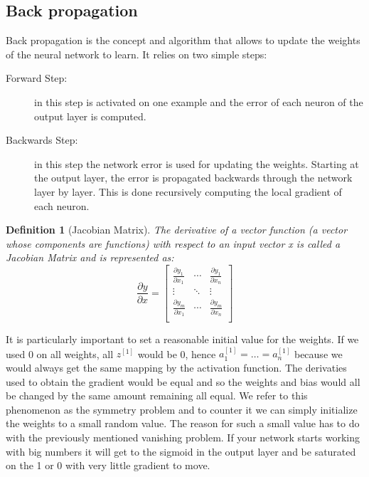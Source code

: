 \documentclass{article}
\newtheorem{definition}{Definition}[section]
\begin{document}
\subsection*{Back propagation}
Back propagation is the concept and algorithm that allows to update the weights of the neural network to learn. It relies on two simple steps:
\begin{description}
    \item[Forward Step:] in this step is activated on one example and the error of each neuron of the output layer is computed.
    \item[Backwards Step:] in this step the network error is used for updating the weights. Starting at the output layer, the error is propagated backwards through the network layer by layer. This is done recursively computing the local gradient of each neuron.  
\end{description}
\begin{definition}[Jacobian Matrix]
    The derivative of a vector function (a vector whose components are functions) with respect to an input vector x is called a Jacobian Matrix and is represented as:
    \[ 
        \frac{\partial y}{\partial x}=
        \begin{bmatrix}
            \frac{\partial y_1}{\partial x_1} & \cdots & \frac{\partial y_1}{\partial x_n} \\
            \vdots & \ddots & \vdots \\
            \frac{\partial y_m}{\partial x_1} & \cdots & \frac{\partial y_m}{\partial x_n} \\
        \end{bmatrix}
    \]
    
\end{definition}
It is particularly important to set a reasonable initial value for the weights. If we used 0 on all weights, all $ z^{[1]} $ would be 0, hence $ a^{[1]}_1 = \ldots =a^{[1]}_n $ because we would always get the same mapping by the activation function. The derivaties used to obtain the gradient would be equal and so the weights and bias would all be changed by the same amount remaining all equal. We refer to this phenomenon as the symmetry problem and to counter it we can simply initialize the weights to a small random value. The reason for such a small value has to do with the previously mentioned vanishing problem. If your network starts working with big numbers it will get to the sigmoid in the output layer and be saturated on the 1 or 0 with very little gradient to move.
\end{document}
